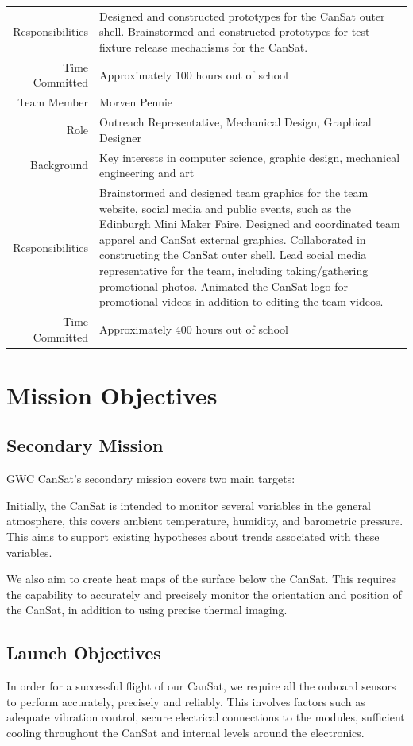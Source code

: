 \documentclass[]{report}
\begin{document}
\begin{center}
\begin{longtable}{rp{13cm}}
		Responsibilities&Designed and constructed prototypes for the CanSat outer shell. Brainstormed and constructed prototypes for test fixture release mechanisms for the CanSat.\\
		Time Committed&Approximately 100 hours out of school\\
		\hline
		Team Member&Morven Pennie \\
		Role&Outreach Representative, Mechanical Design, Graphical Designer \\
		Background&Key interests in computer science, graphic design, mechanical engineering and art \\
		Responsibilities&Brainstormed and designed team graphics for the team website, social media and public events, such as the Edinburgh Mini Maker Faire. Designed and coordinated team apparel and CanSat external graphics. Collaborated in constructing the CanSat outer shell. Lead social media representative for the team, including taking/gathering promotional photos. Animated the CanSat logo for promotional videos in addition to editing the team videos.\\
		Time Committed&Approximately 400 hours out of school\\
	\end{longtable}
\end{center}

\section{Mission Objectives}
\subsection{Secondary Mission}
GWC CanSat's secondary mission covers two main targets:

Initially, the CanSat is intended to monitor several variables in the general atmosphere, this covers ambient temperature, humidity, and barometric pressure. This aims to support existing hypotheses about trends associated with these variables.

We also aim to create heat maps of the surface below the CanSat. This requires the capability to accurately and precisely monitor the orientation and position of the CanSat, in addition to using precise thermal imaging.
\subsection{Launch Objectives}
In order for a successful flight of our CanSat, we require all the onboard sensors to perform accurately, precisely and reliably. This involves factors such as adequate vibration control, secure electrical connections to the modules, sufficient cooling throughout the CanSat and internal levels around the electronics.
\end{document}
